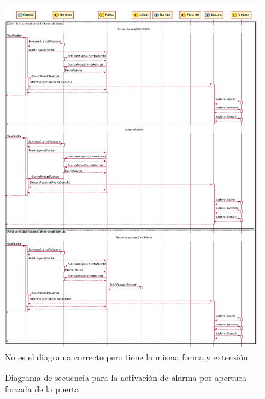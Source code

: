 \begin{figure}[ht]
	\centering
	\includegraphics[width=\textwidth]{Figures/PNK-DS002-B.pdf}
	{\color{red} No es el diagrama correcto pero tiene la misma forma y extensión}
	\caption{Diagrama de secuencia para la activación de alarma por apertura forzada de la puerta}
	\label{fig:SecuenciaForzada}
\end{figure}

